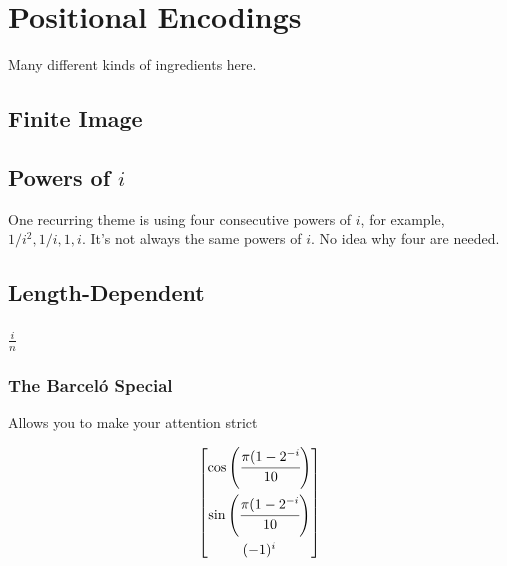 %
\chapter{Positional Encodings}
%

Many different kinds of ingredients here.

\section{Finite Image}

\section{Powers of $i$}

One recurring theme is using four consecutive powers of $i$, for example, $1/i^2, 1/i, 1, i$. It's not always the same powers of $i$. No idea why four are needed.

\section{Length-Dependent}

\subsection{$\frac{i}{n}$}

\subsection{The Barceló Special}

Allows you to make your attention strict 

\[\begin{bmatrix}
    \cos\left(\cfrac{\pi(1-2^{-i}}{10}\right)\\[3ex]
    \sin\left(\cfrac{\pi(1-2^{-i}}{10}\right)\\[3ex]
    (-1)^i
\end{bmatrix}\]